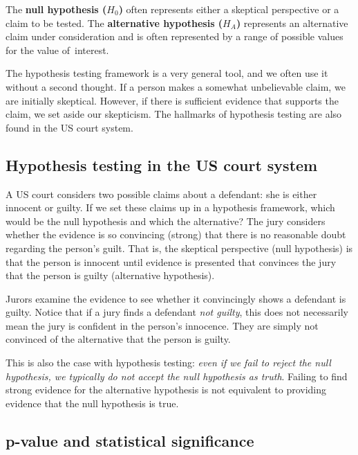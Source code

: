 \begin{termBox}{
The \textbf{null hypothesis ($H_0$)} often represents either a skeptical perspective or a claim to be tested. The \textbf{alternative hypothesis ($H_A$)} represents an alternative claim under consideration and is often represented by a range of possible values for the value of~interest.}
\end{termBox}

The hypothesis testing framework is a very general tool, and we often use it without a second thought. If a person makes a somewhat unbelievable claim, we are initially skeptical. However, if there is sufficient evidence that supports the claim, we set aside our skepticism. The hallmarks of hypothesis testing are also found in the US court system. 

\subsection{Hypothesis testing in the US court system}

\begin{example}{A US court considers two possible claims about a defendant: she is either innocent or guilty. If we set these claims up in a hypothesis framework, which would be the null hypothesis and which the alternative?}\label{hypTestCourtExample}
The jury considers whether the evidence is so convincing (strong) that there is no reasonable doubt regarding the person's guilt. That is, the skeptical perspective (null hypothesis) is that the person is innocent until evidence is presented that convinces the jury that the person is guilty (alternative hypothesis).
\end{example}

Jurors examine the evidence to see whether it convincingly shows a defendant is guilty. Notice that if a jury finds a defendant \emph{not guilty}, this does not necessarily mean the jury is confident in the person's innocence. They are simply not convinced of the alternative that the person is guilty.

This is also the case with hypothesis testing: \emph{even if we fail to reject the null hypothesis, we typically do not accept the null hypothesis as truth}. Failing to find strong evidence for the alternative hypothesis is not equivalent to providing evidence that the null hypothesis is true.


\subsection{p-value and statistical significance}

